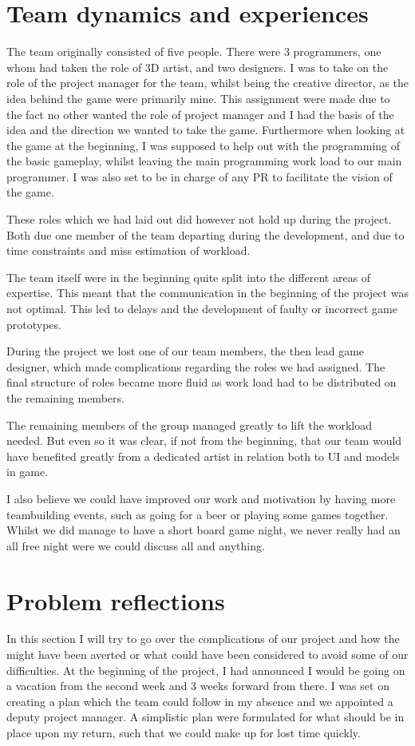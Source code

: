 \documentclass[a4paper,11pt]{article}
\begin{document}
\section{Team dynamics and experiences} %
The team originally consisted of five people. There were 3 programmers, one whom had taken the role of 3D artist, and two designers. 
I was to take on the role of the project manager for the team, whilst being the creative director, as the idea behind the game were primarily mine. This assignment were made due to the fact no other wanted the role of project manager and I had the basis of the idea and the direction we wanted to take the game. 
Furthermore when looking at the game at the beginning, I was supposed to help out with the programming of the basic gameplay, whilst leaving the main programming work load to our main programmer. 
I was also set to be in charge of any PR to facilitate the vision of the game. 

These roles which we had laid out did however not hold up during the project. Both due one member of the team departing during the development, and due to time constraints and miss estimation of workload.

The team itself were in the beginning quite split into the different areas of expertise. This meant that the communication in the beginning of the project was not optimal. This led to delays and the development of faulty or incorrect game prototypes.

During the project we lost one of our team members, the then lead game designer, which made complications regarding the roles we had assigned. The final structure of roles became more fluid as work load had to be distributed on the remaining members. 

The remaining members of the group managed greatly to lift the workload needed. But even so it was clear, if not from the beginning, that our team would have benefited greatly from a dedicated artist in relation both to UI and models in game. 

I also believe we could have improved our work and motivation by having more teambuilding events, such as going for a beer or playing some games together. Whilst we did manage to have a short board game night, we never really had an all free night were we could discuss all and anything. 
\section{Problem reflections} %
\label{probref}
In this section I will try to go over the complications of our project and how the might have been averted or what could have been considered to avoid some of our difficulties.
At the beginning of the project, I had announced I would be going on a vacation from the second week and 3 weeks forward from there. I was set on creating a plan which the team could follow in my absence and we appointed a deputy project manager.
A simplistic plan were formulated for what should be in place upon my return, such that we could make up for lost time quickly. 
\end{document}
